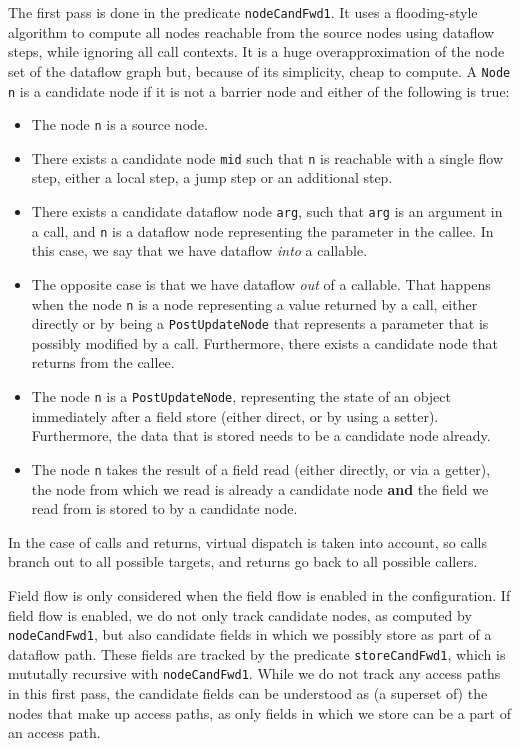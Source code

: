 The first pass is done in the predicate \texttt{nodeCandFwd1}.
It uses a flooding-style algorithm to compute all nodes reachable from the source nodes
using dataflow steps, while ignoring all call contexts.
It is a huge overapproximation of the node set of the dataflow graph 
but, because of its simplicity, cheap to compute.
A \texttt{Node n} is a candidate node if it is not a barrier node and 
either of the following is true:
\begin{itemize}
    \item The node \texttt{n} is a source node.
    \item There exists a candidate node \texttt{mid} such that \texttt{n} is reachable with a single flow step,
    either a local step, a jump step or an additional step.
    \item There exists a candidate dataflow node \texttt{arg}, such that 
    \texttt{arg} is an argument in a call, and \texttt{n} is a dataflow node 
    representing the parameter in the callee.
    In this case, we say that we have dataflow \emph{into} a callable.
    \item The opposite case is that we have dataflow \emph{out} of a callable.
    That happens when the node \texttt{n} is a node representing a value returned by 
    a call, either directly or by being a \texttt{PostUpdateNode} that
    represents a parameter that is possibly modified by a call.
    Furthermore, there exists a candidate node that returns from the callee.
    \item The node \texttt{n} is a \texttt{PostUpdateNode}, representing the state of an 
    object immediately after a field store (either direct, or by using a setter).
    Furthermore, the data that is stored needs to be a candidate node already.
    \item The node \texttt{n} takes the result of a field read 
    (either directly, or via a getter), the node from which we read is already a
    candidate node \textbf{and} the field we read from is stored to 
    by a candidate node.
\end{itemize}
In the case of calls and returns, virtual dispatch is taken into account,
so calls branch out to all possible targets, and returns go back to all possible callers.

Field flow is only considered when the field flow is enabled in the configuration.
If field flow is enabled, we do not only track candidate nodes, as computed by 
\texttt{nodeCandFwd1}, but also candidate fields in which we possibly store as
part of a dataflow path.
These fields are tracked by the predicate \texttt{storeCandFwd1}, which is mututally 
recursive with \texttt{nodeCandFwd1}.
While we do not track any access paths in this first pass,
the candidate fields can be understood as (a superset of) the nodes that make up 
access paths, as only fields in which we store can be a part of an access path.

